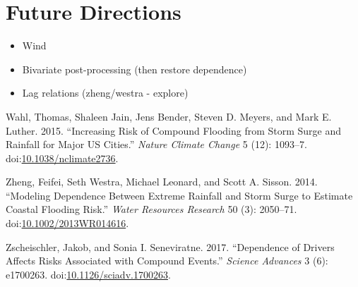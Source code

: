 \documentclass[]{article}
\begin{document}
\section{Future Directions}\label{future-directions}

\begin{itemize}
\item
  Wind
\item
  Bivariate post-processing (then restore dependence)
\item
  Lag relations (zheng/westra - explore)
\end{itemize}

\hypertarget{refs}{}
\hypertarget{ref-wahl_increasing_2015}{}
Wahl, Thomas, Shaleen Jain, Jens Bender, Steven D. Meyers, and Mark E.
Luther. 2015. ``Increasing Risk of Compound Flooding from Storm Surge
and Rainfall for Major US Cities.'' \emph{Nature Climate Change} 5 (12):
1093--7.
doi:\href{https://doi.org/10.1038/nclimate2736}{10.1038/nclimate2736}.

\hypertarget{ref-zheng_modeling_2014}{}
Zheng, Feifei, Seth Westra, Michael Leonard, and Scott A. Sisson. 2014.
``Modeling Dependence Between Extreme Rainfall and Storm Surge to
Estimate Coastal Flooding Risk.'' \emph{Water Resources Research} 50
(3): 2050--71.
doi:\href{https://doi.org/10.1002/2013WR014616}{10.1002/2013WR014616}.

\hypertarget{ref-zscheischler_dependence_2017}{}
Zscheischler, Jakob, and Sonia I. Seneviratne. 2017. ``Dependence of
Drivers Affects Risks Associated with Compound Events.'' \emph{Science
Advances} 3 (6): e1700263.
doi:\href{https://doi.org/10.1126/sciadv.1700263}{10.1126/sciadv.1700263}.
\end{document}
